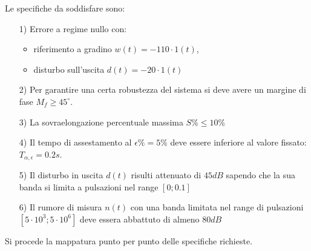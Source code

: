 \documentclass[a4paper, 11pt]{article}
\begin{document}
Le specifiche da soddisfare sono:
\begin{itemize}
	\item[1)] Errore a regime nullo con:
        \begin{itemize}
    \item riferimento a gradino \( w(t) = -110 \cdot 1(t) \),
    \item disturbo sull'uscita \( d(t) = -20 \cdot 1(t) \)
\end{itemize}
	\item[2)] Per garantire una certa robustezza del sistema si deve avere un margine di fase $M_f\ge45^{\circ}$.\label{spec2}
	\item[3)] La sovraelongazione percentuale massima $S\%\le10\%$\label{spec3}
	\item[4)] Il tempo di assestamento al $\epsilon \% = 5\%$ deve essere inferiore al valore fissato: $T_{\alpha,\epsilon}=0.2s$.\label{spec4}
	\item[5)] Il disturbo in uscita $d(t)$ risulti attenuato di $45dB$ sapendo che la sua banda si limita a pulsazioni nel range $[0;0.1]$\label{spec5}
	\item[6)] Il rumore di misura $n(t)$ con una banda limitata nel range di pulsazioni $[5\cdot10^3;5\cdot10^6]$ deve essera abbattuto di almeno $80dB$ \label{spec6}
\end{itemize}
%
Si procede la mappatura punto per punto delle specifiche richieste. 
\end{document}
